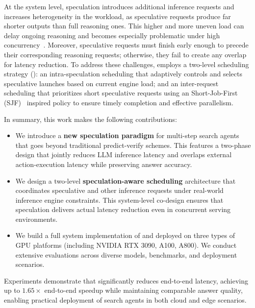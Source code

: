 At the system level, speculation introduces additional inference requests and increases heterogeneity in the workload, as speculative requests produce far shorter outputs than full reasoning ones.
This higher and more uneven load can delay ongoing reasoning and becomes especially problematic under high concurrency~\cite{turbospec}.
Moreover, speculative requests must finish early enough to precede their corresponding reasoning requests; otherwise, they fail to create any overlap for latency reduction.
To address these challenges, \system employs a two-level scheduling strategy (): an intra-speculation scheduling that adaptively controls and selects speculative launches based on current engine load; and an inter-request scheduling that prioritizes short speculative requests using an Short-Job-First (SJF)~\cite{osconcept} inspired policy to ensure timely completion and effective parallelism.


In summary, this work makes the following contributions:

\begin{itemize}[leftmargin=*]
    \item We introduce a \textbf{new speculation paradigm} for multi-step search agents that goes beyond traditional predict-verify schemes.
    This features a two-phase design that jointly reduces LLM inference latency and overlaps external action-execution latency while preserving answer accuracy.
    \item We design a two-level \textbf{speculation-aware scheduling} architecture that coordinates speculative and other inference requests under real-world inference engine constraints. 
    This system-level co-design ensures that speculation delivers actual latency reduction even in concurrent serving environments.
    \item We build a full system implementation of \system and deployed on three types of GPU platforms (including NVIDIA RTX 3090, A100, A800). We conduct extensive evaluations across diverse models, benchmarks, and deployment scenarios.
    
\end{itemize}
Experiments demonstrate that \system significantly reduces end-to-end latency, achieving up to $1.65\times$ end-to-end speedup while maintaining comparable answer quality, enabling practical deployment of search agents in both cloud and edge scenarios.
